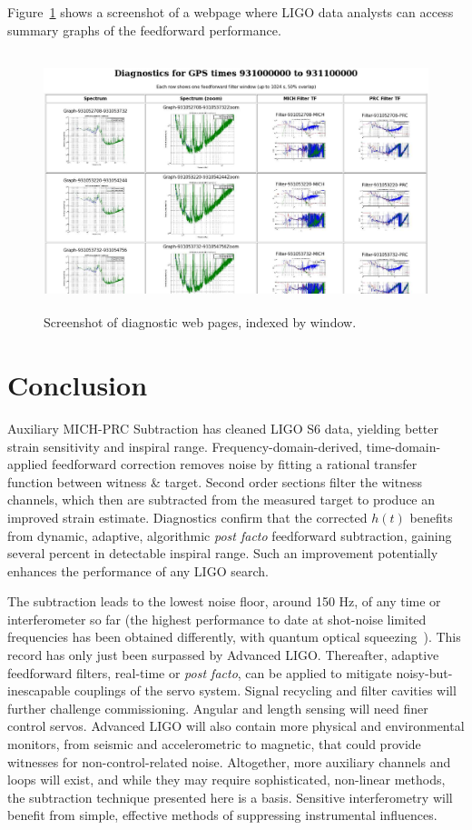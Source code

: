  Figure~\ref{diagnosticWebpages} shows a screenshot of a webpage where LIGO data analysts can access summary graphs of the feedforward performance.

\begin{figure}
\begin{center}
\includegraphics[height=75mm, width=150mm]{figure16.eps}
\caption{Screenshot of diagnostic web pages, indexed by window.}
\label{diagnosticWebpages}
\end{center}
\end{figure}


\section{Conclusion}

Auxiliary MICH-PRC Subtraction has cleaned LIGO S6 data, yielding better strain sensitivity and inspiral range. Frequency-domain-derived, time-domain-applied feedforward correction removes noise by fitting a rational transfer function between witness \& target. Second order sections filter the witness channels, which then are subtracted from the measured target to produce an improved strain estimate. Diagnostics confirm that the corrected $h(t)$ benefits from dynamic, adaptive, algorithmic \textit{post facto} feedforward subtraction, gaining several percent in detectable inspiral range. Such an improvement potentially enhances the performance of any LIGO search. 

The subtraction leads to the lowest noise floor, around 150 Hz, of any time or interferometer so far (the highest performance to date at shot-noise limited frequencies has been obtained differently, with quantum optical squeezing~\cite{BarsottiNatureSqueezing,DwyerPhaseNoise}). This record has only just been surpassed by Advanced LIGO. Thereafter, adaptive feedforward filters, real-time or \textit{post facto}, can be applied to mitigate noisy-but-inescapable couplings of the servo system. Signal recycling and filter cavities will further challenge commissioning. Angular and length sensing will need finer control servos. Advanced LIGO will also contain more physical and environmental monitors, from seismic and accelerometric to magnetic, that could provide witnesses for non-control-related noise. Altogether, more auxiliary channels and loops will exist, and while they may require sophisticated, non-linear methods, the subtraction technique presented here is a basis. Sensitive interferometry will benefit from simple, effective methods of suppressing instrumental influences.

